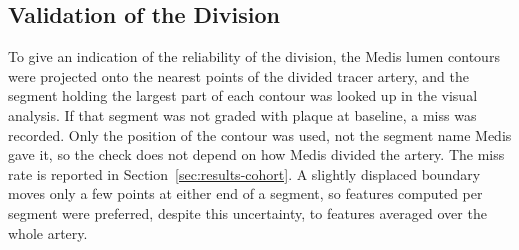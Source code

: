 \subsection{Validation of the Division}
\label{sec:method-split-validation}

To give an indication of the reliability of the division, the Medis lumen contours were projected onto the nearest points of the divided tracer artery, and the segment holding the largest part of each contour was looked up in the visual analysis.
If that segment was not graded with plaque at baseline, a miss was recorded.
Only the position of the contour was used, not the segment name Medis gave it, so the check does not depend on how Medis divided the artery.
The miss rate is reported in Section~\ref{sec:results-cohort}.
A slightly displaced boundary moves only a few points at either end of a segment, so features computed per segment were preferred, despite this uncertainty, to features averaged over the whole artery.
